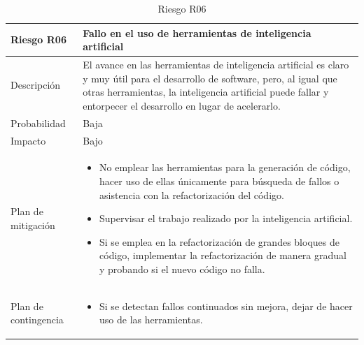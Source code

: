 \begin{table}[H]
	\centering
	\footnotesize
	\begin{tabularx}{\textwidth}{|l|X|}
		\hline
		\rowcolor[HTML]{C0C0C0} 
		\textbf{Riesgo R06}  & \textbf{Fallo en el uso de herramientas de inteligencia artificial} \\ \hline
		Descripción          & El avance en las herramientas de inteligencia artificial es claro y muy útil para el desarrollo de software, pero, al igual que otras herramientas, la inteligencia artificial puede fallar y entorpecer el desarrollo en lugar de acelerarlo. \\ \hline
		Probabilidad         & Baja \\ \hline
		Impacto              & Bajo \\ \hline
		Plan de mitigación   & \begin{minipage}[t]{\linewidth}
			\begin{itemize}[leftmargin=*, noitemsep]
				\item No emplear las herramientas para la generación de código, hacer uso de ellas únicamente para búsqueda de fallos o asistencia con la refactorización del código.
				\item Supervisar el trabajo realizado por la inteligencia artificial.
				\item Si se emplea en la refactorización de grandes bloques de código, implementar la refactorización de manera gradual y probando si el nuevo código no falla.
			\end{itemize}
		\end{minipage} \\ \hline
		Plan de contingencia & \begin{minipage}[t]{\linewidth}
			\begin{itemize}[leftmargin=*, noitemsep]
				\item Si se detectan fallos continuados sin mejora, dejar de hacer uso de las herramientas.
			\end{itemize}
		\end{minipage} \\ \hline
	\end{tabularx}
	\caption{Riesgo R06}
	\label{tab:riesgo_6}
\end{table}

